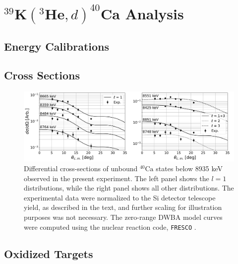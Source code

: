 \section{$^{39}\mathrm{\textbf{K}}(^{3}\mathrm{\textbf{He}},d)^{40}\mathrm{\textbf{Ca}}$ Analysis}

\subsection{Energy Calibrations} \label{subsec:cal}



\subsection{Cross Sections}

\begin{figure}[t]
\centering
\includegraphics[width=6.5in]{Chapter-6/figs/unbound.png}
\caption{\label{fig:unbound_l}Differential cross-sections of unbound $^{40}\mathrm{Ca}$ states below 8935 keV observed in the present experiment. The left panel shows the $l=1$ distributions, while the right panel shows all other distributions. The experimental data were normalized to the Si detector telescope yield, as described in the text, and further scaling for illustration purposes was not necessary. The zero-range DWBA model curves were computed using the nuclear reaction code, \texttt{FRESCO} \cite{Thompson1988,FRESCO}.}
\end{figure}

\subsection{Oxidized Targets} \label{subsec:oxidized_cs}

